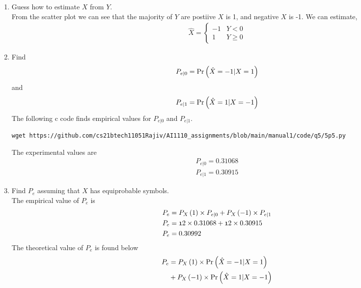 \documentclass[journal,12pt,twocolumn]{IEEEtran}
\renewcommand\thesection{\arabic{section}}
\begin{document}
\begin{enumerate}[label=\thesection.\arabic*
,ref=\thesection.\theenumi]
\begin{figure}[ht!]
    \caption{The scatter plot of $Y$ against $X$}
    \label{fig:scatter}
\end{figure}
%
\item Guess how to estimate $X$ from $Y$.
\\
\solution
From the scatter plot we can see that the majority of $Y$ are postiive $X$ is 1, and negative $X$ is -1. We can estimate, 
\begin{align}
    \hat{X} =
    \begin{cases}
    -1 & Y<0\\
    1 & Y\ge0
    \end{cases}
\end{align}
%
\item
\label{ml-ch4_sim}
Find 
\begin{equation}
	P_{e|0} = \Pr\left(\hat{X} = -1|X=1\right)
\end{equation}
and 
\begin{equation}
	P_{e|1} = \Pr\left(\hat{X} = 1|X=-1\right)
\end{equation}
\solution The following c code finds empirical values for $P_{e|0}$ and $P_{e|1}$.
\begin{lstlisting}
wget https://github.com/cs21btech11051Rajiv/AI1110_assignments/blob/main/manual1/code/q5/5p5.py
\end{lstlisting}
The experimental values are
\begin{align}
    P_{e|0} = 0.31068 \\
    P_{e|1} = 0.30915
\end{align}
%
\item Find $P_e$ assuming that $X$ has equiprobable symbols.
\\ 
\solution The empirical value of $P_e$ is
\begin{align}
    P_e &= P_X\left(1\right) \times P_{e|0} + P_X\left(-1\right) \times P_{e|1} \\
 	P_e &= \frak{1}{2} \times 0.31068  + \frak{1}{2} \times 0.30915 \\
 	P_e &= 0.30992
\end{align}
The theoretical value of $P_e$ is found below
\begin{align}
\begin{split}
    P_e &= P_X\left(1\right) \times \Pr\left(\hat{X} = -1|X=1\right) \\
    &+ P_X\left(-1\right) \times \Pr\left(\hat{X} = 1|X= -1\right)
\end{split} 
\end{align}
\begin{align}
\begin{split}

\end{split}
\end{align}
\end{enumerate}
\end{document}
